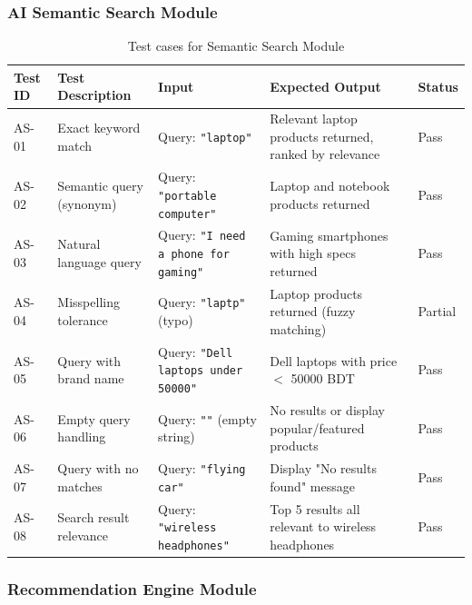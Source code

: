 \subsubsection*{AI Semantic Search Module}

\begin{table}[H]
\centering
\caption{Test cases for Semantic Search Module}
\label{tab:test-search}
\small
\begin{tabular}{|p{1.3cm}|p{3.5cm}|p{3cm}|p{3.5cm}|p{1.2cm}|}
\hline
\textbf{Test ID} & \textbf{Test Description} & \textbf{Input} & \textbf{Expected Output} & \textbf{Status} \\
\hline
AS-01 & Exact keyword match & Query: \texttt{"laptop"} & Relevant laptop products returned, ranked by relevance & Pass \\
\hline
AS-02 & Semantic query (synonym) & Query: \texttt{"portable computer"} & Laptop and notebook products returned & Pass \\
\hline
AS-03 & Natural language query & Query: \texttt{"I need a phone for gaming"} & Gaming smartphones with high specs returned & Pass \\
\hline
AS-04 & Misspelling tolerance & Query: \texttt{"laptp"} (typo) & Laptop products returned (fuzzy matching) & Partial \\
\hline
AS-05 & Query with brand name & Query: \texttt{"Dell laptops under 50000"} & Dell laptops with price $<$ 50000 BDT & Pass \\
\hline
AS-06 & Empty query handling & Query: \texttt{""} (empty string) & No results or display popular/featured products & Pass \\
\hline
AS-07 & Query with no matches & Query: \texttt{"flying car"} & Display "No results found" message & Pass \\
\hline
AS-08 & Search result relevance & Query: \texttt{"wireless headphones"} & Top 5 results all relevant to wireless headphones & Pass \\
\hline
\end{tabular}
\end{table}

\subsubsection*{Recommendation Engine Module}

